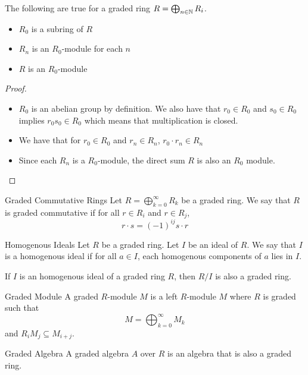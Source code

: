\documentclass[a4paper]{article}
\begin{document}
\begin{prp}{}{} The following are true for a graded ring $R=\bigoplus_{n\in\mathbb{N}}R_i$. 
\begin{itemize}
\item $R_0$ is a subring of $R$
\item $R_n$ is an $R_0$-module for each $n$
\item $R$ is an $R_0$-module
\end{itemize} \tcbline
\begin{proof}~\\
\begin{itemize}
\item $R_0$ is an abelian group by definition. We also have that $r_0\in R_0$ and $s_0\in R_0$ implies $r_0s_0\in R_0$ which means that multiplication is closed. 
\item We have that for $r_0\in R_0$ and $r_n\in R_n$, $r_0\cdot r_n\in R_n$
\item Since each $R_n$ is a $R_0$-module, the direct sum $R$ is also an $R_0$ module. 
\end{itemize}
\end{proof}
\end{prp}

\begin{defn}{Graded Commutative Rings}{} Let $R=\bigoplus_{k=0}^\infty R_k$ be a graded ring. We say that $R$ is graded commutative if for all $r\in R_i$ and $r\in R_j$, $$r\cdot s=(-1)^{ij}s\cdot r$$
\end{defn}

\begin{defn}{Homogenous Ideals}{} Let $R$ be a graded ring. Let $I$ be an ideal of $R$. We say that $I$ is a homogenous ideal if for all $a\in I$, each homogenous components of $a$ lies in $I$. 
\end{defn}

\begin{prp}{}{} If $I$ is an homogenous ideal of a graded ring $R$, then $R/I$ is also a graded ring. 
\end{prp}

\begin{defn}{Graded Module}{} A graded $R$-module $M$ is a left $R$-module $M$ where $R$ is graded such that $$M=\bigoplus_{k=0}^\infty M_k$$ and $R_iM_j\subseteq M_{i+j}$. 
\end{defn}

\begin{defn}{Graded Algebra}{} A graded algebra $A$ over $R$ is an algebra that is also a graded ring. 
\end{defn}
\end{document}

